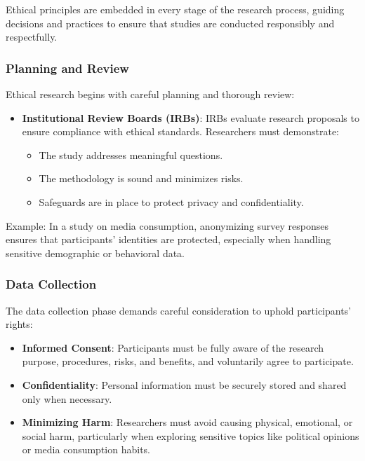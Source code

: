\documentclass[
]{book}
\providecommand{\tightlist}{%
  \setlength{\itemsep}{0pt}\setlength{\parskip}{0pt}}
\begin{document}
Ethical principles are embedded in every stage of the research process, guiding decisions and practices to ensure that studies are conducted responsibly and respectfully.

\subsubsection*{Planning and Review}\label{planning-and-review}

Ethical research begins with careful planning and thorough review:

\begin{itemize}
\tightlist
\item
  \textbf{Institutional Review Boards (IRBs)}: IRBs evaluate research proposals to ensure compliance with ethical standards. Researchers must demonstrate:

  \begin{itemize}
  \tightlist
  \item
    The study addresses meaningful questions.
  \item
    The methodology is sound and minimizes risks.
  \item
    Safeguards are in place to protect privacy and confidentiality.
  \end{itemize}
\end{itemize}

Example: In a study on media consumption, anonymizing survey responses ensures that participants' identities are protected, especially when handling sensitive demographic or behavioral data.

\subsubsection*{Data Collection}\label{data-collection}

The data collection phase demands careful consideration to uphold participants' rights:

\begin{itemize}
\tightlist
\item
  \textbf{Informed Consent}: Participants must be fully aware of the research purpose, procedures, risks, and benefits, and voluntarily agree to participate.
\item
  \textbf{Confidentiality}: Personal information must be securely stored and shared only when necessary.
\item
  \textbf{Minimizing Harm}: Researchers must avoid causing physical, emotional, or social harm, particularly when exploring sensitive topics like political opinions or media consumption habits.
\end{itemize}
\end{document}
